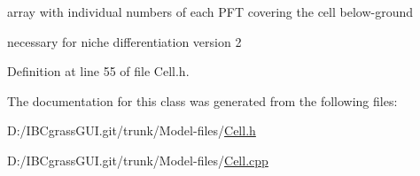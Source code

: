 array with individual numbers of each P\+FT covering the cell below-\/ground 

necessary for niche differentiation version 2 

Definition at line 55 of file Cell.\+h.



The documentation for this class was generated from the following files\+:\begin{DoxyCompactItemize}
\item 
D\+:/\+I\+B\+Cgrass\+G\+U\+I.\+git/trunk/\+Model-\/files/\mbox{\hyperlink{_cell_8h}{Cell.\+h}}\item 
D\+:/\+I\+B\+Cgrass\+G\+U\+I.\+git/trunk/\+Model-\/files/\mbox{\hyperlink{_cell_8cpp}{Cell.\+cpp}}\end{DoxyCompactItemize}
